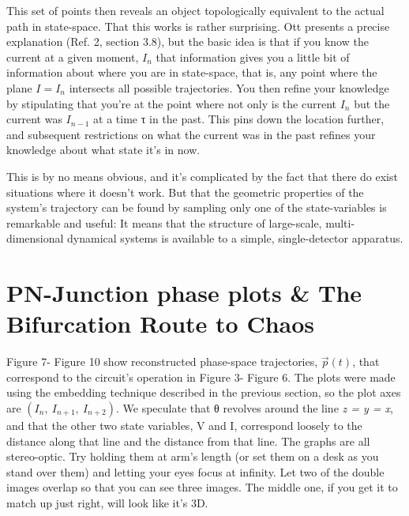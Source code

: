 \documentclass{../lab}
\begin{document}
This set of points then reveals an object topologically equivalent to the actual path in state-space. That this works is rather surprising. Ott presents a precise explanation (Ref. 2, section 3.8), but the basic idea is that if you know the current at a given moment, $I_n$ that information gives you a little bit of information about where you are in state-space, that is, any point where the plane $I=I_n$ intersects all possible trajectories. You then refine your knowledge by stipulating that you're at the point where not only is the current  $I_n$ but the current was $I_{n-1}$ at a time τ in the past. This pins down the location further, and subsequent restrictions on what the current was in the past refines your knowledge about what state it's in now.

This is by no means obvious, and it's complicated by the fact that there do exist situations where it doesn't work. But that the geometric properties of the system's trajectory can be found by sampling only one of the state-variables is remarkable and useful: It means that the structure of large-scale, multi-dimensional dynamical systems is available to a simple, single-detector apparatus.

\section{PN-Junction phase plots \& The Bifurcation Route to Chaos}

Figure 7- Figure 10 show reconstructed phase-space trajectories, $ \vec p(t) $, that correspond to the circuit's operation in Figure 3- Figure 6. The plots were made using the embedding technique described in the previous section, so the plot axes are $ (I_n,~I_{n+1},~I_{n+2}) $. We speculate that θ revolves around the line \emph{z = y = x}, and that the other two state variables, V and I, correspond loosely to the distance along that line and the distance from that line. The graphs are all stereo-optic. Try holding them at arm's length (or set them on a desk as you stand over them) and letting your eyes focus at infinity. Let two of the double images overlap so that you can see three images. The middle one, if you get it to match up just right, will look like it's 3D.
\end{document}
